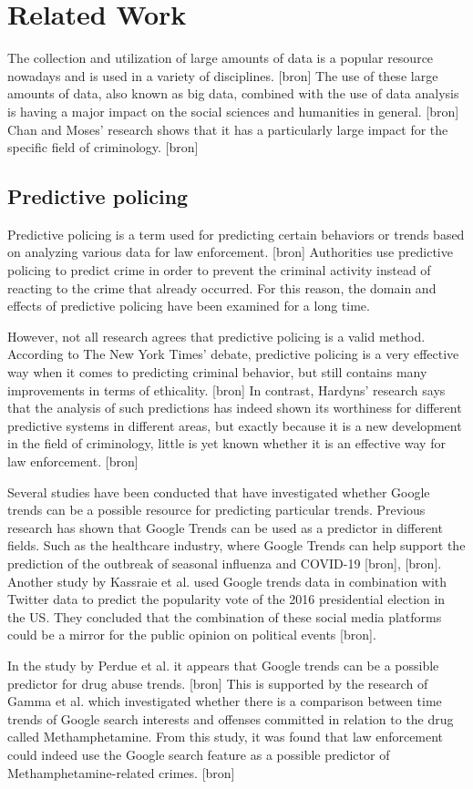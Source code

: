 \section{Related Work}

The collection and utilization of large amounts of data is a popular resource nowadays and is used in a variety of disciplines. [bron] The use of these large amounts of data, also known as big data, combined with the use of data analysis is having a major impact on the social sciences and humanities in general. [bron] Chan and Moses' research shows that it has a particularly large impact for the specific field of criminology. [bron] 

\subsection{Predictive policing}

Predictive policing is a term used for predicting certain behaviors or trends based on analyzing various data for law enforcement. [bron] Authorities use predictive policing to predict crime in order to prevent the criminal activity instead of reacting to the crime that already occurred. For this reason, the domain and effects of predictive policing have been examined for a long time. 

However, not all research agrees that predictive policing is a valid method. According to The New York Times' debate, predictive policing is a very effective way when it comes to predicting criminal behavior, but still contains many improvements in terms of ethicality. [bron] In contrast, Hardyns' research says that the analysis of such predictions has indeed shown its worthiness for different predictive systems in different areas, but exactly because it is a new development in the field of criminology, little is yet known whether it is an effective way for law enforcement. [bron] 

Several studies have been conducted that have investigated whether Google trends can be a possible resource for predicting particular trends. Previous research has shown that Google Trends can be used as a predictor in different fields. Such as the healthcare industry, where Google Trends can help support the prediction of the outbreak of seasonal influenza and COVID-19 [bron], [bron]. Another study by Kassraie et al. used Google trends data in combination with Twitter data to predict the popularity vote of the 2016 presidential election in the US. They concluded that the combination of these social media platforms could be a mirror for the public opinion on political events [bron].

In the study by Perdue et al. it appears that Google trends can be a possible predictor for drug abuse trends. [bron] This is supported by the research of Gamma et al. which investigated whether there is a comparison between time trends of Google search interests and offenses committed in relation to the drug called Methamphetamine. From this study, it was found that law enforcement could indeed use the Google search feature as a possible predictor of Methamphetamine-related crimes. [bron]